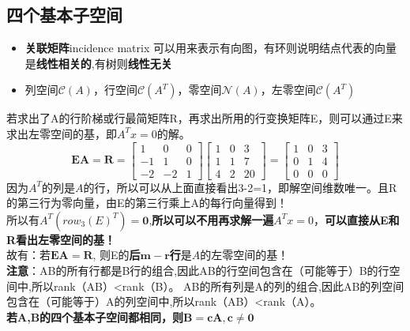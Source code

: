 \documentclass[UTF8]{article}
\begin{document}
    \subsection{四个基本子空间}
    \begin{itemize}
        \item \textbf{关联矩阵}incidence matrix 可以用来表示有向图，有环则说明结点代表的向量是\textbf{线性相关的},有树则\textbf{线性无关}
        \item 列空间$\mathcal{C}(A)$，行空间$\mathcal{C}(A^T)$，零空间$\mathcal{N}(A)$，左零空间$\mathcal{C}(A^T)$
    \end{itemize}
    若求出了A的行阶梯或行最简矩阵R，再求出所用的行变换矩阵E，则可以通过E来求出左零空间的基，即$A^Tx=0$的解。
    \\
    $$\boldsymbol{E} \boldsymbol{A}=\boldsymbol{R}
    =
    \left[\begin{array}{rrr}{1} & {0} & {0} \\ {-1} & {1} & {0} \\ {-2} & {-2} & {1}\end{array}\right]
    \left[\begin{array}{lll}{1} & {0} & {3} \\ {1} & {1} & {7} \\ {4} & {2} & {20}\end{array}\right]
    =
    \left[\begin{array}{lll}{1} & {0} & {3} \\ {0} & {1} & {4} \\ {0} & {0} & {0}\end{array}\right]
    $$
    因为$A^T$的列是$A$的行，所以可以从上面直接看出3-2=1，即解空间维数唯一。且R的第三行为零向量，由E的第三行乘上A的每行向量得到！
    \\
    所以有$A^T({row_3(E)}^T)=\textbf{0}$,\textbf{所以可以不用再求解一遍}$A^Tx=0$，\textbf{可以直接从E和R看出左零空间的基！}
    \\
    故有：若$\boldsymbol{E} \boldsymbol{A}=\boldsymbol{R}$, 则E的\textbf{后$\bm{m-r}$行}是$A$的左零空间的基！
    \\
    \textbf{注意}：AB的所有行都是B行的组合,因此AB的行空间包含在（可能等于）B的行空间中,所以rank（AB）<rank（B）。
    AB的所有列是A的列的组合,因此AB的列空间包含在（可能等于）A的列空间中,所以rank（AB）<rank（A）。
    \\
    \textbf{若A,B的四个基本子空间都相同，则}$\bm{B=cA,c\neq 0}$
\end{document}
